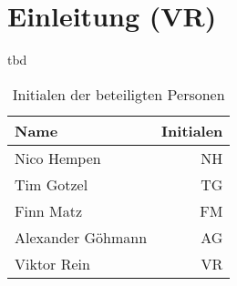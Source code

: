 \chapter{Einleitung (VR)}
\label{c:Einleitung}

tbd




\begin{table}[h]
	\centering
	\begin{tabular}{lr}
		
		Name & \hspace{0.5cm} Initialen\\
		\hline
		Nico Hempen & NH\\
		Tim Gotzel & TG\\
		Finn Matz & FM\\
		Alexander Göhmann & AG \\
		Viktor Rein & VR\\
		\hline
		
	\end{tabular}
	\caption{Initialen der beteiligten Personen}
	\label{tab:initialien}
\end{table}
